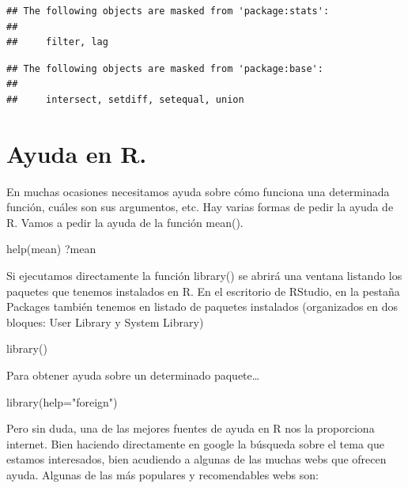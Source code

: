 \documentclass[
]{book}
\newenvironment{Shaded}{\begin{snugshade}}{\end{snugshade}}
\newcommand{\AttributeTok}[1]{\textcolor[rgb]{0.77,0.63,0.00}{#1}}
\newcommand{\FunctionTok}[1]{\textcolor[rgb]{0.00,0.00,0.00}{#1}}
\newcommand{\NormalTok}[1]{#1}
\newcommand{\StringTok}[1]{\textcolor[rgb]{0.31,0.60,0.02}{#1}}
\begin{document}
\begin{verbatim}
## The following objects are masked from 'package:stats':
## 
##     filter, lag
\end{verbatim}

\begin{verbatim}
## The following objects are masked from 'package:base':
## 
##     intersect, setdiff, setequal, union
\end{verbatim}

\hypertarget{ayuda-en-r.}{%
\section{Ayuda en R.}\label{ayuda-en-r.}}

En muchas ocasiones necesitamos ayuda sobre cómo funciona una determinada función, cuáles son sus argumentos, etc. Hay varias formas de pedir la ayuda de R. Vamos a pedir la ayuda de la función mean().

\begin{Shaded}
\begin{Highlighting}[]
\FunctionTok{help}\NormalTok{(mean)}
\NormalTok{?mean}
\end{Highlighting}
\end{Shaded}

Si ejecutamos directamente la función library() se abrirá una ventana listando los paquetes que tenemos instalados en R. En el escritorio de RStudio, en la pestaña Packages también tenemos en listado de paquetes instalados (organizados en dos bloques: User Library y System Library)

\begin{Shaded}
\begin{Highlighting}[]
\FunctionTok{library}\NormalTok{()}
\end{Highlighting}
\end{Shaded}

Para obtener ayuda sobre un determinado paquete\ldots{}

\begin{Shaded}
\begin{Highlighting}[]
\FunctionTok{library}\NormalTok{(}\AttributeTok{help=}\StringTok{"foreign"}\NormalTok{)}
\end{Highlighting}
\end{Shaded}

Pero sin duda, una de las mejores fuentes de ayuda en R nos la proporciona internet. Bien haciendo directamente en google la búsqueda sobre el tema que estamos interesados, bien acudiendo a algunas de las muchas webs que ofrecen ayuda. Algunas de las más populares y recomendables webs son:
\end{document}

